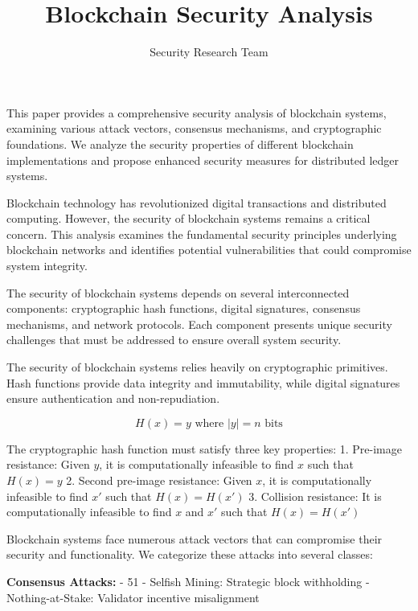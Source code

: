 \documentclass{article}
\title{Blockchain Security Analysis}
\author{Security Research Team}
\date{}
\begin{document}
\maketitle

This paper provides a comprehensive security analysis of blockchain systems, examining various attack vectors, consensus mechanisms, and cryptographic foundations. We analyze the security properties of different blockchain implementations and propose enhanced security measures for distributed ledger systems.

Blockchain technology has revolutionized digital transactions and distributed computing. However, the security of blockchain systems remains a critical concern. This analysis examines the fundamental security principles underlying blockchain networks and identifies potential vulnerabilities that could compromise system integrity.

The security of blockchain systems depends on several interconnected components: cryptographic hash functions, digital signatures, consensus mechanisms, and network protocols. Each component presents unique security challenges that must be addressed to ensure overall system security.

The security of blockchain systems relies heavily on cryptographic primitives. Hash functions provide data integrity and immutability, while digital signatures ensure authentication and non-repudiation.

\begin{equation}
H(x) = y \text{ where } |y| = n \text{ bits}
\end{equation}

The cryptographic hash function must satisfy three key properties:
1. Pre-image resistance: Given $y$, it is computationally infeasible to find $x$ such that $H(x) = y$
2. Second pre-image resistance: Given $x$, it is computationally infeasible to find $x'$ such that $H(x) = H(x')$
3. Collision resistance: It is computationally infeasible to find $x$ and $x'$ such that $H(x) = H(x')$

Blockchain systems face numerous attack vectors that can compromise their security and functionality. We categorize these attacks into several classes:

\textbf{Consensus Attacks:}
- 51%
- Selfish Mining: Strategic block withholding
- Nothing-at-Stake: Validator incentive misalignment
\end{document}
